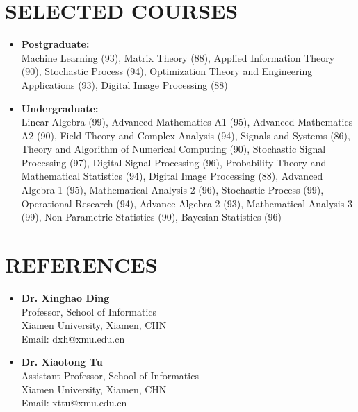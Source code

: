 \documentclass[11pt,a4paper,roman]{moderncv}        %
\begin{document}
	
	
	\section{SELECTED COURSES}
	
	\begin{itemize}
		\item \textbf{Postgraduate:} \vspace*{0.75mm} \\
		Machine Learning (93), Matrix Theory (88), Applied Information Theory (90), Stochastic Process (94), Optimization Theory and Engineering Applications (93), Digital Image Processing (88)
		\vspace*{1.75mm}
		\item \textbf{Undergraduate:} \vspace*{0.75mm} \\
		Linear Algebra (99), Advanced Mathematics A1 (95), Advanced Mathematics A2 (90), Field Theory and Complex Analysis (94), Signals and Systems (86), Theory and Algorithm of Numerical Computing (90), Stochastic Signal Processing (97), Digital Signal Processing (96), Probability Theory and Mathematical Statistics (94), Digital Image Processing (88), Advanced Algebra 1 (95), Mathematical Analysis 2 (96), Stochastic Process (99), Operational Research (94), Advance Algebra 2 (93), Mathematical Analysis 3 (99), Non-Parametric Statistics (90), Bayesian Statistics (96)
 	\end{itemize}
	
	\section{REFERENCES}
	
	\vspace*{-3.5mm}
	
	\begin{multicols}{2}
		\begin{itemize}
			\item \textbf{Dr. Xinghao Ding}\\
			Professor, School of Informatics\\
			Xiamen University, Xiamen, CHN \\
			Email: dxh@xmu.edu.cn
		\end{itemize}
		
		\begin{itemize}
			\item \textbf{Dr. Xiaotong Tu}\\
			Assistant Professor, School of Informatics\\
			Xiamen University, Xiamen, CHN\\
			Email: xttu@xmu.edu.cn
		\end{itemize}
	\end{multicols}
	
\end{document}
